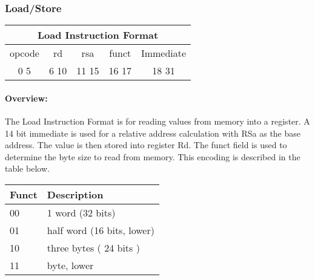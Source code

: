 \documentclass[letterpaper, 11pt]{article}
\begin{document}
\subsubsection{Load/Store}
\begin{center}
		\begin{tabular}{|c|c|c|c|c|}
			\multicolumn{5}{c}{Load Instruction Format}\\ \hline
				\hspace{2pt} opcode \hspace{2pt} & \hspace{5pt} rd \hspace{5pt} &  \hspace{4pt} rsa \hspace{4pt} & \hspace{3pt} funct \hspace{3pt} & \hspace{10pt} Immediate \hspace{10pt}   \\	\hline
				0 \hfill 5&6 \hfill 10&11 \hfill 15&16 \hfill 17&18 \hfill 31\\ \hline
		
	\end{tabular}
\end{center}
\paragraph{Overview:}The Load Instruction Format is for reading values from memory into a register. A 14 bit immediate is used
for a relative address calculation with RSa as the base address. The value is then stored into register Rd. The funct field is used
to determine the byte size to read from memory. This encoding is described in the table below. \\
\begin{tabular}{l|l}
		Funct & Description \\ \hline
		00	  & 1 word (32 bits) \\
		01	  & half word (16 bits, lower) \\ 
		10	  & three bytes ( 24 bits )\\
		11	  & byte, lower		\\
		\end{tabular}
\end{document}
